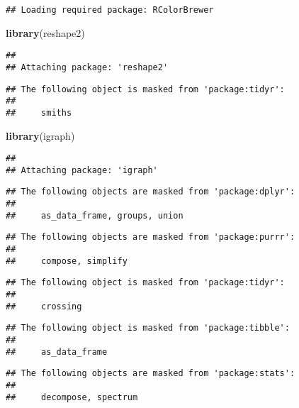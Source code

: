 \documentclass[]{article}
\newenvironment{Shaded}{\begin{snugshade}}{\end{snugshade}}
\newcommand{\KeywordTok}[1]{\textcolor[rgb]{0.13,0.29,0.53}{\textbf{{#1}}}}
\newcommand{\NormalTok}[1]{{#1}}
\begin{document}
\begin{verbatim}
## Loading required package: RColorBrewer
\end{verbatim}

\begin{Shaded}
\begin{Highlighting}[]
\KeywordTok{library}\NormalTok{(reshape2)}
\end{Highlighting}
\end{Shaded}

\begin{verbatim}
## 
## Attaching package: 'reshape2'
\end{verbatim}

\begin{verbatim}
## The following object is masked from 'package:tidyr':
## 
##     smiths
\end{verbatim}

\begin{Shaded}
\begin{Highlighting}[]
\KeywordTok{library}\NormalTok{(igraph)}
\end{Highlighting}
\end{Shaded}

\begin{verbatim}
## 
## Attaching package: 'igraph'
\end{verbatim}

\begin{verbatim}
## The following objects are masked from 'package:dplyr':
## 
##     as_data_frame, groups, union
\end{verbatim}

\begin{verbatim}
## The following objects are masked from 'package:purrr':
## 
##     compose, simplify
\end{verbatim}

\begin{verbatim}
## The following object is masked from 'package:tidyr':
## 
##     crossing
\end{verbatim}

\begin{verbatim}
## The following object is masked from 'package:tibble':
## 
##     as_data_frame
\end{verbatim}

\begin{verbatim}
## The following objects are masked from 'package:stats':
## 
##     decompose, spectrum
\end{verbatim}
\end{document}
